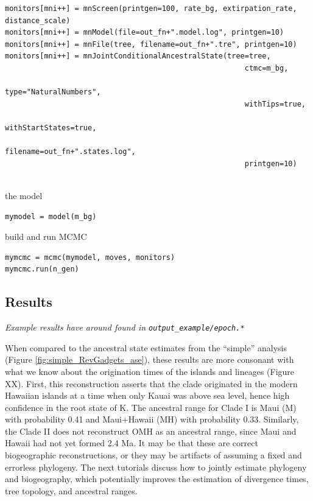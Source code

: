 \begin{snugshade}
\begin{lstlisting}
monitors[mni++] = mnScreen(printgen=100, rate_bg, extirpation_rate, distance_scale)
monitors[mni++] = mnModel(file=out_fn+".model.log", printgen=10)
monitors[mni++] = mnFile(tree, filename=out_fn+".tre", printgen=10)
monitors[mni++] = mnJointConditionalAncestralState(tree=tree,
                                                       ctmc=m_bg,
                                                       type="NaturalNumbers",
                                                       withTips=true,
                                                       withStartStates=true,
                                                       filename=out_fn+".states.log",
                                                       printgen=10)
                                                       
\end{lstlisting}
\end{snugshade}

the model

\begin{snugshade}
\begin{lstlisting}
mymodel = model(m_bg)
\end{lstlisting}
\end{snugshade}

build and run MCMC
\begin{snugshade}
\begin{lstlisting}
mymcmc = mcmc(mymodel, moves, monitors)
mymcmc.run(n_gen)
\end{lstlisting}
\end{snugshade}

\subsection*{Results}

{\it Example results have around found in {\tt output\_example/epoch.*} }

When compared to the ancestral state estimates from the ``simple'' analysis (Figure \ref{fig:simple_RevGadgets_ase}), these results are more consonant with what we know about the origination times of the islands and lineages (Figure XX).
First, this reconstruction asserts that the clade originated in the modern Hawaiian islands at a time when only Kauai was above sea level, hence high confidence in the root state of K.
The ancestral range for Clade I is Maui (M) with probability 0.41 and Maui+Hawaii (MH) with probability 0.33.
Similarly, the Clade II does not reconstruct OMH as an ancestral range, since Maui and Hawaii had not yet formed 2.4 Ma.
It may be that these are correct biogeographic reconstructions, or they may be artifacts of assuming a fixed and errorless phylogeny.
The next tutorials discuss how to jointly estimate phylogeny and biogeography, which potentially improves the estimation of divergence times, tree topology, and ancestral ranges.



